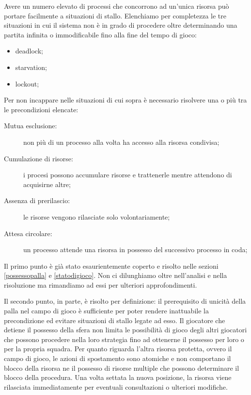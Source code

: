 \documentclass[aps,letterpaper,10pt]{article}
\begin{document}
Avere un numero elevato di processi che concorrono ad un'unica risorsa pu\`o portare facilmente a situazioni di stallo. Elenchiamo per completezza le tre situazioni in cui il sistema non \`e in grado di procedere oltre determinando una partita infinita o immodificabile fino alla fine del tempo di gioco:

\begin{itemize}
	\item deadlock;
	\item starvation;
	\item lockout;
\end{itemize}

Per non incappare nelle situazioni di cui sopra \`e necessario risolvere una o pi\`u tra le precondizioni elencate:

\begin{description}
	\item[Mutua esclusione:] non pi\`u di un processo alla volta ha accesso alla risorsa condivisa;
	\item[Cumulazione di risorse:] i procesi possono accumulare risorse e trattenerle mentre attendono di acquisirne altre;
	\item[Assenza di prerilascio:] le risorse vengono rilasciate solo volontariamente;
	\item[Attesa circolare:] un processo attende una risorsa in possesso del successivo processo in coda;
\end{description}

Il primo punto \`e gi\`a stato esaurientemente coperto e risolto nelle sezioni \ref{possessopalla} e \ref{statodigioco}. Non ci dilunghiamo oltre nell'analisi e nella risoluzione ma rimandiamo ad essi per ulteriori approfondimenti. \vspace{3mm}

Il secondo punto, in parte, \`e risolto per definizione: il prerequisito di unicit\`a della palla nel campo di gioco \`e sufficiente per poter rendere inattuabile la precondizione ed evitare situazioni di stallo legate ad esso. Il giocatore che detiene il possesso della sfera non limita le possibilit\`a di gioco degli altri giocatori che possono procedere nella loro strategia fino ad ottenerne il possesso per loro o per la propria squadra. Per quanto riguarda l'altra risorsa protetta, ovvero il campo di gioco, le azioni di spostamento sono atomiche e non comportano il blocco della risorsa ne il possesso di risorse multiple che possono determinare il blocco della procedura. Una volta settata la nuova posizione, la risorsa viene rilasciata immediatamente per eventuali consultazioni o ulteriori modifiche. \vspace{3mm}
\end{document}
